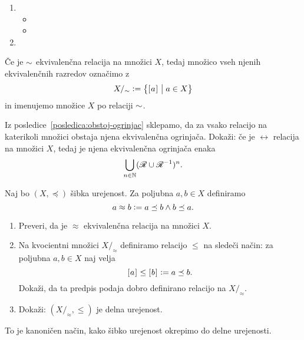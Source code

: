                 \begin{dokaz}
                        \begin{enumerate}
                                \item
                                        \begin{itemize}
                                                \item{}
                                                \item{}
                                        \end{itemize}
                                \item
                        \end{enumerate}
                \end{dokaz}

                Če je $\sim$ ekvivalenčna relacija na množici $X$, tedaj množico vseh njenih ekvivalenčnih razredov označimo z
                \[X/_\equ \dfeq \set[1]{\ec{a}}{a \in X}\]
                in imenujemo  množice $X$ po relaciji $\sim$.


                \begin{vaja}
                        Iz posledice~\ref{posledica:obstoj-ogrinjac} sklepamo, da za vsako relacijo na katerikoli množici obstaja njena ekvivalenčna ogrinjača. Dokaži: če je $\rel$ relacija na množici $X$, tedaj je njena ekvivalenčna ogrinjača enaka
                        \[\bigcup_{n \in \NN} (\rel \cup \rel^{-1})^n.\]
                \end{vaja}

                \begin{vaja}
                        Naj bo $(X, \preceq)$ šibka urejenost. Za poljubna $a, b \in X$ definiramo
                        \[a \approx b \mathrel{\mathop:}= a \preceq b \land b \preceq a.\]
                        \begin{enumerate}
                                \item
                                        Preveri, da je $\approx$ ekvivalenčna relacija na množici $X$.
                                \item
                                        Na kvocientni množici $X/_\approx$ definiramo relacijo $\leq$ na sledeči način: za poljubna $a, b \in X$ naj velja
                                        \[[\:\!{a}\:\!]_{} \leq [\:\!{b}\:\!]_{} \mathrel{\mathop:}= a \preceq b.\]
                                        Dokaži, da ta predpis podaja dobro definirano relacijo na $X/_\approx$.
                                \item
                                        Dokaži: $(X/_\approx, \leq)$ je delna urejenost.
                        \end{enumerate}
                        To je kanoničen način, kako šibko urejenost okrepimo do delne urejenosti.
                \end{vaja}

